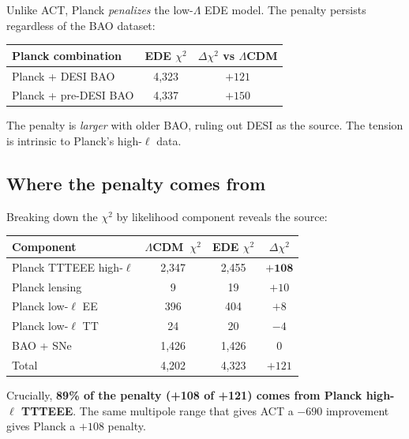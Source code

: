 \documentclass[twocolumn,showpacs,preprintnumbers,amsmath,amssymb,prd]{revtex4-2}
\newcommand{\lcdm}{$\Lambda$CDM}
\begin{document}
Unlike ACT, Planck \emph{penalizes} the low-$\Lambda$ EDE model. The penalty 
persists regardless of the BAO dataset:
\begin{center}
\begin{tabular}{lcc}
\toprule
Planck combination & EDE $\chi^2$ & $\Delta\chi^2$ vs \lcdm \\
\midrule
Planck + DESI BAO & 4,323 & $+121$ \\
Planck + pre-DESI BAO & 4,337 & $+150$ \\
\bottomrule
\end{tabular}
\end{center}

The penalty is \emph{larger} with older BAO, ruling out DESI as the source. 
The tension is intrinsic to Planck's high-$\ell$ data.

\subsection{Where the penalty comes from}

Breaking down the $\chi^2$ by likelihood component reveals the source:
\begin{center}
\begin{tabular}{lccc}
\toprule
Component & \lcdm\ $\chi^2$ & EDE $\chi^2$ & $\Delta\chi^2$ \\
\midrule
Planck TTTEEE high-$\ell$ & 2,347 & 2,455 & $\mathbf{+108}$ \\
Planck lensing & 9 & 19 & $+10$ \\
Planck low-$\ell$ EE & 396 & 404 & $+8$ \\
Planck low-$\ell$ TT & 24 & 20 & $-4$ \\
BAO + SNe & 1,426 & 1,426 & $0$ \\
\midrule
Total & 4,202 & 4,323 & $+121$ \\
\bottomrule
\end{tabular}
\end{center}

Crucially, \textbf{89\% of the penalty (+108 of +121) comes from Planck high-$\ell$ 
TTTEEE}. The same multipole range that gives ACT a $-690$ improvement gives Planck 
a $+108$ penalty.
\end{document}
